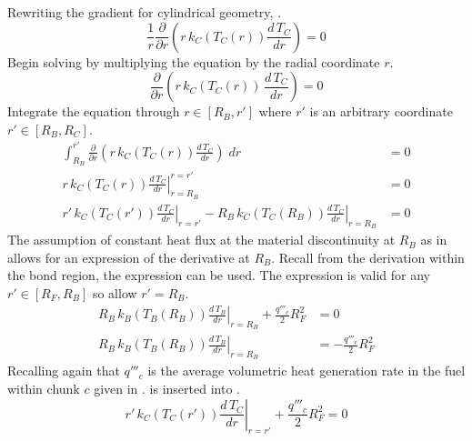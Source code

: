       Rewriting the gradient for cylindrical geometry,
      .
      \begin{equation}
        \label{eq:clad_conduction}
        \frac{1}{r} \frac{\partial}{\partial r} \left( r\, k_C(T_C(r)) 
          \frac{d\,T_C}{dr} \right) = 0
      \end{equation}
      Begin solving  by multiplying the equation by the
      radial coordinate $r$.
      \begin{equation}
        \frac{\partial}{\partial r} \left( r\,k_C(T_C(r))\,\frac{d\,T_C}{dr}
          \right) = 0
      \end{equation}
      Integrate the equation through $r \in [R_B,r']$ where $r'$ is an arbitrary
      coordinate $r' \in [R_B,R_C]$.
      \begin{align}
        \int_{R_B}^{r'} \frac{\partial}{\partial r} \left( r \, k_C(T_C(r))
          \frac{d\,T_C}{dr} \right) \; dr &= 0 \\
        \left. r\,k_C(T_C(r)) \frac{d\,T_C}{dr} \right|_{r=R_B}^{r=r'} &= 0 \\
        \label{eq:clad_before}
        \left. r' \, k_C(T_C(r')) \frac{d\,T_C}{dr} \right|_{r=r'} - 
          \left. R_B \, k_C(T_C(R_B)) \frac{d\,T_C}{dr} \right|_{r=R_B} &= 0
      \end{align}
      The assumption of constant heat flux at the material discontinuity at
      $R_B$ as in  allows for an expression of the 
      derivative at $R_B$. Recall from the derivation within the bond region,
      the expression  can be used. The expression is valid
      for any $r' \in [R_F,R_B]$ so allow $r'=R_B$.
      \begin{align}
        \left. R_B \, k_B(T_B(R_B)) \frac{d\,T_B}{dr} \right|_{r=R_B} +
          \frac{q'''_c}{2} R_F^2 &= 0 \\
        \label{eq:clad_bc_relation}
        \left. R_B \, k_B(T_B(R_B)) \frac{d\,T_B}{dr} \right|_{r=R_B} &= 
          - \frac{q'''_c}{2} R_F^2
      \end{align}
      Recalling again that $q'''_c$ is the average volumetric heat generation
      rate in the fuel within chunk $c$ given in .
       is inserted into .
      \begin{equation}
        \left. r' \, k_C(T_C(r')) \frac{d\,T_C}{dr} \right|_{r=r'} + 
          \frac{q'''_c}{2} R_F^2 = 0
      \end{equation}
